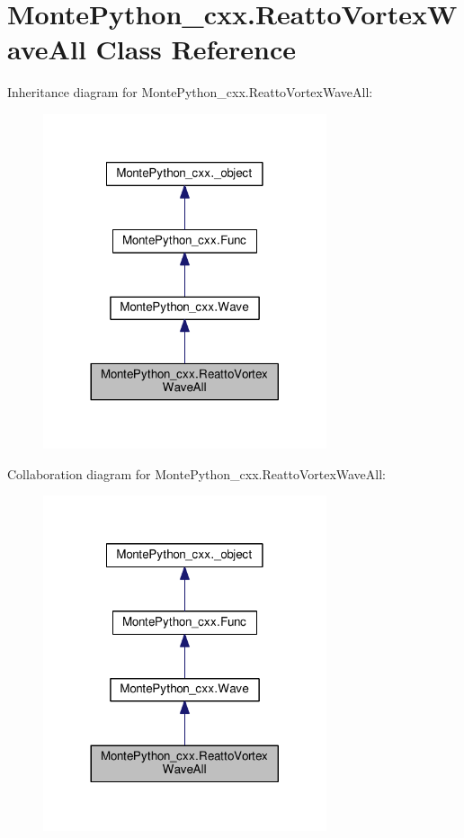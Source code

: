 \hypertarget{classMontePython__cxx_1_1ReattoVortexWaveAll}{}\section{Monte\+Python\+\_\+cxx.\+Reatto\+Vortex\+Wave\+All Class Reference}
\label{classMontePython__cxx_1_1ReattoVortexWaveAll}


Inheritance diagram for Monte\+Python\+\_\+cxx.\+Reatto\+Vortex\+Wave\+All\+:
\nopagebreak
\begin{figure}[H]
\begin{center}
\leavevmode
\includegraphics[width=236pt]{classMontePython__cxx_1_1ReattoVortexWaveAll__inherit__graph}
\end{center}
\end{figure}


Collaboration diagram for Monte\+Python\+\_\+cxx.\+Reatto\+Vortex\+Wave\+All\+:
\nopagebreak
\begin{figure}[H]
\begin{center}
\leavevmode
\includegraphics[width=236pt]{classMontePython__cxx_1_1ReattoVortexWaveAll__coll__graph}
\end{center}
\end{figure}
